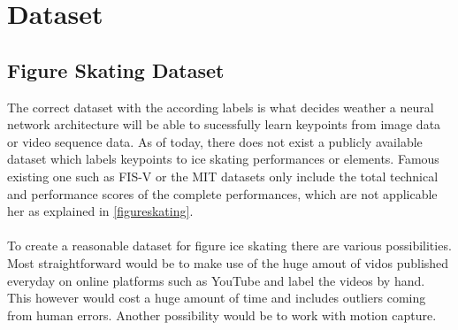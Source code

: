

\chapter{Dataset} %

\label{Synthetic Dataset} %



\section{Figure Skating Dataset}

The correct dataset with the according labels is what decides weather a neural network architecture will be able
to sucessfully learn keypoints from image data or video sequence data.
As of today, there does not exist a publicly available dataset which labels keypoints to ice skating performances or
elements.
Famous existing one such as FIS-V or the MIT datasets only include the total technical and performance scores of the
complete performances, which are not applicable her as explained in \autoref{figureskating}.
\\\mbox{}\\
To create a reasonable dataset for figure ice skating there are various possibilities.
Most straightforward would be to make use of the huge amout of vidos published everyday on online platforms such as
YouTube and label the videos by hand. This however would cost a huge amount of time and includes outliers coming from
human errors.
Another possibility would be to work with motion capture.
\\\mbox{}\\


